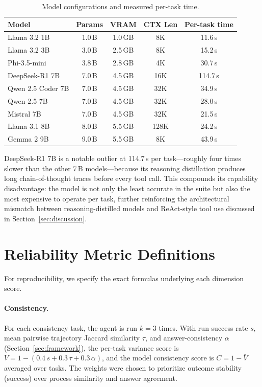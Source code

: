 \begin{table}[h]
\centering
\caption{Model configurations and measured per-task time.}
\label{tab:model_configs}
\small
\begin{tabular}{lcccc}
\toprule
\textbf{Model} & \textbf{Params} & \textbf{VRAM} & \textbf{CTX Len} & \textbf{Per-task time} \\
\midrule
Llama 3.2 1B & 1.0\,B & 1.0\,GB & 8K & 11.6\,s \\
Llama 3.2 3B & 3.0\,B & 2.5\,GB & 8K & 15.2\,s \\
Phi-3.5-mini & 3.8\,B & 2.8\,GB & 4K & 30.7\,s \\
DeepSeek-R1 7B & 7.0\,B & 4.5\,GB & 16K & 114.7\,s \\
Qwen 2.5 Coder 7B & 7.0\,B & 4.5\,GB & 32K & 34.9\,s \\
Qwen 2.5 7B & 7.0\,B & 4.5\,GB & 32K & 28.0\,s \\
Mistral 7B & 7.0\,B & 4.5\,GB & 32K & 21.5\,s \\
Llama 3.1 8B & 8.0\,B & 5.5\,GB & 128K & 24.2\,s \\
Gemma 2 9B & 9.0\,B & 5.5\,GB & 8K & 43.9\,s \\
\bottomrule
\end{tabular}
\end{table}

DeepSeek-R1 7B is a notable outlier at 114.7\,s per task---roughly four times slower than the other 7\,B models---because its reasoning distillation produces long chain-of-thought traces before every tool call. This compounds its capability disadvantage: the model is not only the least accurate in the suite but also the most expensive to operate per task, further reinforcing the architectural mismatch between reasoning-distilled models and ReAct-style tool use discussed in Section~\ref{sec:discussion}.

\section{Reliability Metric Definitions}
\label{app:metrics}

For reproducibility, we specify the exact formulas underlying each dimension score.

\paragraph{Consistency.} For each consistency task, the agent is run $k = 3$ times. With run success rate $s$, mean pairwise trajectory Jaccard similarity $\tau$, and answer-consistency $\alpha$ (Section~\ref{sec:framework}), the per-task variance score is $V = 1 - (0.4\,s + 0.3\,\tau + 0.3\,\alpha)$, and the model consistency score is $C = 1 - \bar{V}$ averaged over tasks. The weights were chosen to prioritize outcome stability (success) over process similarity and answer agreement.

